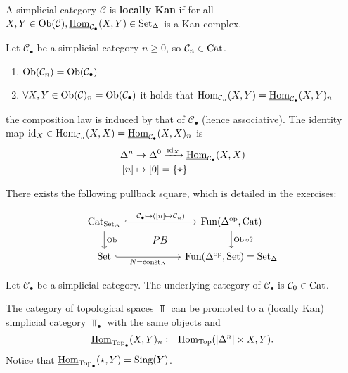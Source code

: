 \begin{defi}
	A simplicial category $ \mathcal{ C } $ is \textbf{locally Kan} if for all $ X ,Y \in \operatorname{Ob} ( \mathcal{ C } ) , \underline{ \operatorname{Hom} }_{ \mathcal{ C }_\bullet } ( X , Y ) \in \operatorname{Set}_{\Delta} $ is a Kan complex. 
\end{defi}

\begin{construction}
	Let $ \mathcal{ C }_\bullet $ be a simplicial category $ n \geq 0 $, so $ \mathcal{ C }_n \in \operatorname{Cat} $.
	\begin{enumerate}
		\item 
		$ \operatorname{Ob} (\mathcal{ C }_n ) = \operatorname{Ob} ( \mathcal{ C }_\bullet ) $
		
		\item 
		$ \forall X , Y \in \operatorname{Ob}( \mathcal{ C } )_n = \operatorname{Ob} ( \mathcal{ C }_\bullet ) $ it holds that 
		$ \operatorname{Hom}_{ \mathcal{ C }_n } ( X ,Y ) = \underline{ \operatorname{Hom} }_{ \mathcal{ C }_\bullet } ( X , Y )_n $
	\end{enumerate}
	the composition law is induced by that of $ \mathcal{ C }_\bullet $ (hence associative).
	The identity map $ \operatorname{id}_X \in \operatorname{Hom}_{ \mathcal{ C }_n } ( X , X ) = \underline{ \operatorname{Hom} }_{ \mathcal{ C }_\bullet } ( X , X )_n $ is 
	\begin{align*}
		\Delta^n 
		&\to
		\Delta^0 
		\xrightarrow{ \operatorname{id}_X } 
		\underline{ \operatorname{Hom} }_{ \mathcal{ C }_\bullet } ( X , X ) 
		\\
		[n]
		&\mapsto
		[0] = \{ \star \}
	\end{align*}
\end{construction}

There exists the following pullback square, which is detailed in the exercises:

\[
\begin{tikzcd}[column sep=2cm]
	\Cat_{ \SetD }
	\ar[r, hook, " { \mathcal{ C }_\bullet \mapsto ( [ n ] \mapsto \mathcal{ C }_n ) }"]
	\ar[d, " \Ob "]
		\ar[d, phantom,"PB",shift left=2cm]
	&
	\Fun ( \Delta^{\op} , \Cat )
	\ar[d, "{ \Ob \circ ? }"]
	\\
	\Set
	\ar[r, hook, "{ N = \const_\Delta }"']
	&
	\Fun ( \Delta^{\op} ,\Set ) = \SetD
\end{tikzcd}
\]

\begin{defi}
	Let $ \mathcal{ C }_\bullet $ be a simplicial category.
	The underlying category of $ \mathcal{ C }_\bullet $ is $ \mathcal{ C }_0 \in \operatorname{Cat} $. 
\end{defi}

\begin{exmp}
	The category of topological spaces $ \Top $ can be promoted to a (locally Kan) simplicial category $\Top_\bullet $ with the same objects and 
	\[
		\underline{\operatorname{Hom}}_{\operatorname{Top}_\bullet} ( X , Y )_n 
		\coloneqq 
		\operatorname{Hom}_{ \operatorname{Top} } ( \lvert \Delta^n \rvert \times X , Y ).
	\]
	Notice that $ \underline{ \operatorname{Hom} }_{ \operatorname{Top}_\bullet } ( \star , Y ) = \operatorname{Sing}( Y ) $.
\end{exmp}

